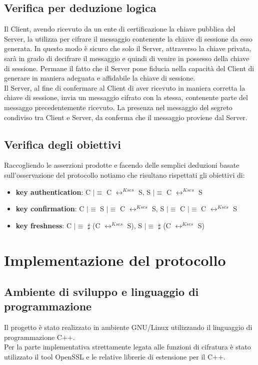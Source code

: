 \documentclass[12pt, a4paper]{article}
\begin{document}
\subsection{Verifica per deduzione logica}
Il Client, avendo ricevuto da un ente di certificazione la chiave pubblica del Server, la utilizza per cifrare il messaggio contenente la chiave di sessione da esso generata. In questo modo è sicuro che solo il Server, attraverso la chiave privata, sarà in grado di decifrare il messaggio e quindi di venire in possesso della chiave di sessione. Permane il fatto che il Server pone fiducia nella capacità del Client di generare in maniera adeguata e affidabile la chiave di sessione.\\
Il Server, al fine di confermare al Client di aver ricevuto in maniera corretta la chiave di sessione, invia un messaggio cifrato con la stessa, contenente parte del messaggo precedentemente ricevuto. La presenza nel messaggio del segreto condiviso tra Client e Server, da conferma che il messaggio proviene dal Server.
\subsection{Verifica degli obiettivi}
Raccogliendo le asserzioni prodotte e facendo delle semplici deduzioni basate sull'osservazione del protocollo notiamo che risultano rispettati gli obiettivi di:
\begin{itemize}
\item 
\textbf{key authentication}: C $\mid\equiv$ C $\longleftrightarrow^{Kses}$ S, S $\mid\equiv$ C $\longleftrightarrow^{Kses}$ S
\item 
\textbf{key confirmation}: C $\mid\equiv$ S $\mid\equiv$ C $\longleftrightarrow^{Kses}$ S, S $\mid\equiv$ C $\mid\equiv$ C $\longleftrightarrow^{Kses}$ S
\item 
\textbf{key freshness}: C $\mid\equiv$ $\sharp$ (C $\longleftrightarrow^{Kses}$ S), S $\mid\equiv$ $\sharp$ (C $\longleftrightarrow^{Kses}$ S)
\end{itemize}
\newpage
\section{Implementazione del protocollo}
\subsection{Ambiente di sviluppo e linguaggio di programmazione}
Il progetto è stato realizzato in ambiente GNU/Linux utilizzando il linguaggio di programmazione C++.\\
Per la parte implementativa strettamente legata alle funzioni di cifratura è stato utilizzato il tool OpenSSL e le relative librerie di estensione per il C++.
\end{document}
